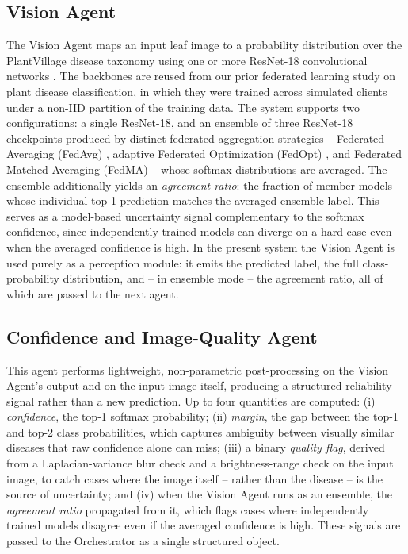 \documentclass[conference]{IEEEtran}
\begin{document}
\subsection{Vision Agent}
The Vision Agent maps an input leaf image to a probability distribution over the PlantVillage disease taxonomy using one or more ResNet-18 convolutional networks \cite{r_he2016}. The backbones are reused from our prior federated learning study on plant disease classification, in which they were trained across simulated clients under a non-IID partition of the training data. The system supports two configurations: a single ResNet-18, and an ensemble of three ResNet-18 checkpoints produced by distinct federated aggregation strategies -- Federated Averaging (FedAvg) \cite{r_fedavg}, adaptive Federated Optimization (FedOpt) \cite{r_fedopt}, and Federated Matched Averaging (FedMA) \cite{r_fedma} -- whose softmax distributions are averaged. The ensemble additionally yields an \emph{agreement ratio}: the fraction of member models whose individual top-1 prediction matches the averaged ensemble label. This serves as a model-based uncertainty signal complementary to the softmax confidence, since independently trained models can diverge on a hard case even when the averaged confidence is high. In the present system the Vision Agent is used purely as a perception module: it emits the predicted label, the full class-probability distribution, and -- in ensemble mode -- the agreement ratio, all of which are passed to the next agent.

\subsection{Confidence and Image-Quality Agent}
This agent performs lightweight, non-parametric post-processing on the Vision Agent's output and on the input image itself, producing a structured reliability signal rather than a new prediction. Up to four quantities are computed: (i) \emph{confidence}, the top-1 softmax probability; (ii) \emph{margin}, the gap between the top-1 and top-2 class probabilities, which captures ambiguity between visually similar diseases that raw confidence alone can miss; (iii) a binary \emph{quality flag}, derived from a Laplacian-variance blur check and a brightness-range check on the input image, to catch cases where the image itself -- rather than the disease -- is the source of uncertainty; and (iv) when the Vision Agent runs as an ensemble, the \emph{agreement ratio} propagated from it, which flags cases where independently trained models disagree even if the averaged confidence is high. These signals are passed to the Orchestrator as a single structured object.
\end{document}
